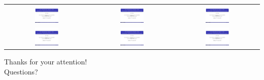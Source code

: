 \documentclass{beamer}
\begin{document}
\begin{frame}
\begin{tabular}{ccc}
\includegraphics[page=7, width=0.3\textwidth]{ali.pdf} &
\includegraphics[page=11, width=0.3\textwidth]{ali.pdf} &
\includegraphics[page=12, width=0.3\textwidth]{ali.pdf} \\

\includegraphics[page=18, width=0.3\textwidth]{ali.pdf} &
\includegraphics[page=26, width=0.3\textwidth]{ali.pdf} &
\includegraphics[page=29, width=0.3\textwidth]{ali.pdf} \\




\end{tabular}

\begin{block}{}
\centering Thanks for your attention!\\
Questions?
\end{block}
\end{frame}
\end{document}
